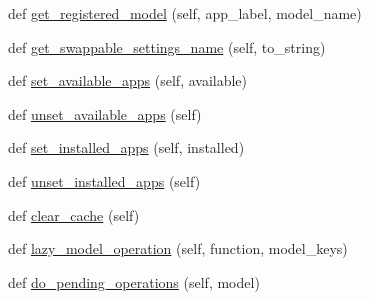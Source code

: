 \begin{DoxyCompactItemize}
\item 
def \mbox{\hyperlink{classdjango_1_1apps_1_1registry_1_1_apps_a1f7538579bf34258180bf6ec39e3ad40}{get\+\_\+registered\+\_\+model}} (self, app\+\_\+label, model\+\_\+name)
\item 
def \mbox{\hyperlink{classdjango_1_1apps_1_1registry_1_1_apps_a33919f7ae3592674248f55f4c2ac9cc1}{get\+\_\+swappable\+\_\+settings\+\_\+name}} (self, to\+\_\+string)
\item 
def \mbox{\hyperlink{classdjango_1_1apps_1_1registry_1_1_apps_a247cf36e424a835d2d1c211077090220}{set\+\_\+available\+\_\+apps}} (self, available)
\item 
def \mbox{\hyperlink{classdjango_1_1apps_1_1registry_1_1_apps_a7c128e2c2e7d2424daea3add910d8113}{unset\+\_\+available\+\_\+apps}} (self)
\item 
def \mbox{\hyperlink{classdjango_1_1apps_1_1registry_1_1_apps_a8ae4c1eb0ea6e28b02d81c56248d3fd5}{set\+\_\+installed\+\_\+apps}} (self, installed)
\item 
def \mbox{\hyperlink{classdjango_1_1apps_1_1registry_1_1_apps_af7409dd22d1f192cb2d743622ef08ff7}{unset\+\_\+installed\+\_\+apps}} (self)
\item 
def \mbox{\hyperlink{classdjango_1_1apps_1_1registry_1_1_apps_a3dabf3bb1475c2e1ce598cf59420d96c}{clear\+\_\+cache}} (self)
\item 
def \mbox{\hyperlink{classdjango_1_1apps_1_1registry_1_1_apps_a9f34ee8b1b29eb7e69bad8caf1a50d7f}{lazy\+\_\+model\+\_\+operation}} (self, function, model\+\_\+keys)
\item 
def \mbox{\hyperlink{classdjango_1_1apps_1_1registry_1_1_apps_a4e7a349e650b3d4b0b70ce5554f59ed2}{do\+\_\+pending\+\_\+operations}} (self, model)
\end{DoxyCompactItemize}
